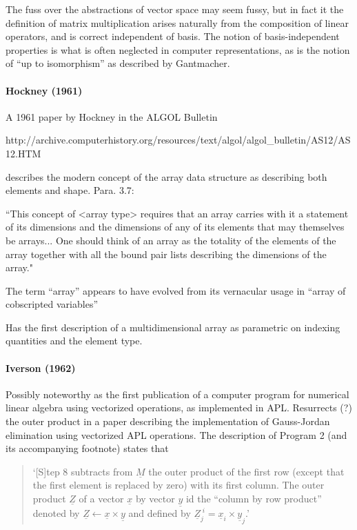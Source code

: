 The fuss over the abstractions of vector space may seem fussy, but in fact it the definition of matrix multiplication arises naturally from the composition of linear operators, and is correct independent of basis. The notion of basis-independent properties is what is often neglected in computer representations, as is the notion of ``up to isomorphism'' as described by Gantmacher.



\paragraph{Hockney (1961)}

A 1961 paper by Hockney in the ALGOL Bulletin

http://archive.computerhistory.org/resources/text/algol/algol_bulletin/AS12/AS12.HTM

describes the modern concept of the array data structure as describing
both elements and shape. Para. 3.7:

“This concept of <array type> requires that an array carries with it a
statement of its dimensions and the dimensions of any of its elements
that may themselves be arrays... One should think of an array as the
totality of the elements of the array together with all the bound pair
lists describing the dimensions of the array."

The term ``array'' appears to have evolved from its vernacular usage in ``array of cobscripted variables''

Has the first description of a multidimensional array as parametric on indexing quantities and the element type.




\paragraph{Iverson (1962)~\cite{Iverson1962}}

Possibly noteworthy as the first publication of a computer program for numerical linear algebra using vectorized operations, as implemented in APL.
Resurrects (?) the outer product in a paper describing the implementation of Gauss-Jordan elimination using vectorized APL operations. The description of Program 2 (and its accompanying footnote) states that

\begin{quote}
`[S]tep 8 subtracts from $\underline{\textit{M}}$ the outer product of the first row (except that the first element is replaced by zero) with its first column. The outer product $\underline{\textit{Z}}$ of a vector $\underline{\textit{x}}$ by vector $\underline{\textit{y}}$ id the ``column by row product'' denoted by $\underline{\textit{Z}} \leftarrow \underline{\textit{x}} \times \underline{\textit{y}}$ and defined by $\underline{\textit{Z}}^{\; i}_j = \underline{\textit{x}}_i \times \underline{\textit{y}}_j$.'
\end{quote}

